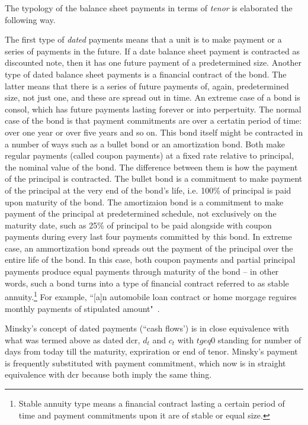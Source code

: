 The typology of the balance sheet payments in terms of \textit{tenor} is elaborated the following way. 

The first type of \textit{dated} payments means that a unit is to make payment or a series of payments in the future. If a date balance sheet payment is contracted as discounted note, then it has one future payment of a predetermined size. Another type of dated balance sheet payments is a financial contract of the bond. The latter means that there is a series of future payments of, again, predetermined size, not just one, and these are spread out in time. An extreme case of a bond is consol, which has future payments lasting forever or into perpertuity. The normal case of the bond is that payment commitments are over a certatin period of time: over one year or over five years and so on. This bond itself might be contracted in a number of ways such as a bullet bond or an amortization bond. Both make regular payments (called coupon payments) at a fixed rate relative to principal, the nominal value of the bond. The difference between them is how the payment of the principal is contracted. The bullet bond is a commitment to make payment of the principal at the very end of the bond's life, i.e. 100\% of principal is paid upon maturity of the bond. The amortizaion bond is a commitment to make payment of the principal at predetermined schedule, not exclusively on the maturity date, such as 25\% of principal to be paid alongside with coupon payments during every last four payments committed by this bond. In extreme case, an ammortization bond spreads out the payment of the principal over the entire life of the bond. In this case, both coupon payments and partial principal payments produce equal payments through maturity of the bond -- in other words, such a bond turns into a type of financial contract referred to as stable annuity.\footnote{Stable annuity type means a financial contract lasting a certain period of time and payment commitments upon it are of stable or equal size.} For example, ``[a]n automobile loan contract or home morgage reguires monthly payments of stipulated amount"~\citep[p.~224]{minsky1986}. 

Minsky's concept of dated payments (``cash flows') is in close equivalence with what was termed above as dated \acf{dcr}, $d_t$ and $c_t$ with $t geq 0$ standing for number of days from today till the maturity, expriration or end of tenor. Minsky's payment is frequently substituted with payment commitment, which now is in straight equivalence with \ac{dcr} because both imply the same thing.  

